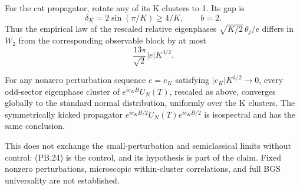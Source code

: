 For the cat propagator, rotate any of its K clusters to 1. Its gap is \[
 \delta_K=2\sin(\pi/K)\geq4/K,\qquad b=2.
\] Thus the empirical law of the rescaled relative eigenphases \(\sqrt{K/2}\,\theta_j/e\) differs in \(W_2\) from the corresponding observable block by at most \[
 \frac{13\pi}{\sqrt2}|e|K^{3/2}. \tag{PB.24}
\]
\begin{corollary}\label{pass1:pell_blocks-4} For any nonzero perturbation sequence \(e=e_K\) satisfying \(|e_K|K^{3/2}\to0\), every odd-sector eigenphase cluster of \(e^{ie_KB}U_N(T)\), rescaled as above, converges globally to the standard normal distribution, uniformly over the K clusters. The symmetrically kicked propagator \(e^{ie_KB/2}U_N(T)e^{ie_KB/2}\) is isospectral and has the same conclusion.
\end{corollary}

This does not exchange the small-perturbation and semiclassical limits without control: (PB.24) is the control, and its hypothesis is part of the claim. Fixed nonzero perturbations, microscopic within-cluster correlations, and full BGS universality are not established.

